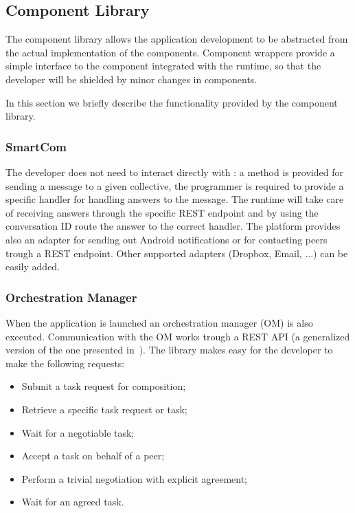 \subsection{Component Library}
The component library allows the application development to be abstracted from the actual implementation of the components.
Component wrappers provide a simple interface to the component integrated with the runtime, so that the developer will be shielded by minor changes in components. %

In this section we briefly describe the functionality %
provided by the component library. %
\subsubsection{SmartCom}
The developer does not need to interact directly with \mdl: 
a method is provided for sending a message to a given collective, the programmer is required to provide a specific handler for handling answers to the message. The runtime will take care of receiving answers through the specific REST endpoint 
and by using the conversation ID route the answer to the correct handler. The platform provides also an adapter for sending out Android notifications or for contacting peers trough a REST endpoint. Other supported adapters (Dropbox, Email, ...) can be easily added. 

\subsubsection{Orchestration Manager}
When the application is launched %
an orchestration manager (OM) is also executed. Communication with the OM works trough a REST API (a generalized version of the one presented in~\cite{D6.2}). %
The library makes easy for the developer to make the following requests:
\begin{itemize}
	\item Submit a task request for composition;
	\item Retrieve a specific task request or task;
	\item Wait for a negotiable task;
	\item Accept a task on behalf of a peer;
	\item Perform a trivial negotiation with explicit agreement; 
	\item Wait for an agreed task.
\end{itemize}

